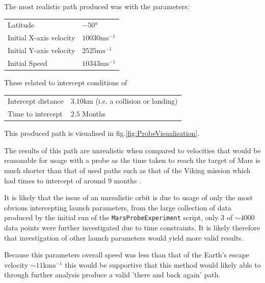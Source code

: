 \documentclass{article}
\begin{document}
                \pagebreak
                \par 
                The most realistic path produced was with the parameters:
                \begin{center}
                    \begin{tabular}{ll}
                        Latitude & $-50 \si{\degree}$\\
                        Initial X-axis velocity  & $10030\si{\meter \second ^{-1}}$\\
                        Initial Y-axis velocity &  $2525\si{\meter \second ^{-1}}$\\
                        Initial Speed & $10343\si{\meter \second ^{-1}}$
                        \label{tab:ParamUsed}
                    \end{tabular}
                \end{center}
                These related to intercept conditions of
                \begin{center}
                    \begin{tabular}{ll}
                        Intercept distance & $3.10\si{\kilo\meter}$ (i.e. a collision or landing)\\
                        Time to intercept & $2.5$ Months
                        \label{tab:ParamUsed}
                    \end{tabular}
                \end{center}
                
                This produced path is visualised in fig.\ref{fig:ProbeVisualisation}.
                \par
                The results of this path are unrealistic when compared to velocities that would be
                reasonable for usage with a probe as the time taken to reach the target of Mars is 
                much shorter than that of used paths such as that of the Viking mission which had 
                times to intercept of around 9 months \cite{VIKINGPROGRAMNASA}. 
                \par
                It is likely that the issue of an unrealistic orbit is due to 
                usage of only the most obvious intercepting launch parameters, from the large 
                collection of data produced by the initial run of the \verb|MarsProbeExperiment| 
                script, only $3$ of $\sim 4000$ data points were further investigated due to time
                constraints. It is likely therefore that investigation of other launch parameters 
                would yield more valid results. 
                \par
                Because this parameters overall speed was less than that of the Earth's escape 
                velocity $\sim 11\si{\kilo\meter \second^{-1}}$\cite{EarthEscapeVel} this would be 
                supportive that this method would likely able to through further analysis produce a 
                valid 'there and back again' path.
\end{document}

